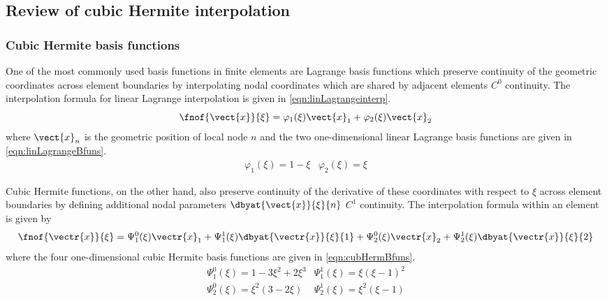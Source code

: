 \subsection{Review of cubic Hermite interpolation}

\subsubsection{Cubic Hermite basis functions}

One of the most commonly used basis functions in finite elements are Lagrange
basis functions which preserve continuity of the geometric coordinates across
element boundaries by interpolating nodal coordinates which are shared by
adjacent elements \ie  $C^{0}$ continuity.  The interpolation formula for
linear Lagrange interpolation is given in \eqref{eqn:linLagrangeinterp}.
\begin{equation}
  \fnof{\vect{x}}{\xi}=\varphi_{1}(\xi)\vect{x}_{1}+\varphi_{2}(\xi)\vect{x}_{2}
  \label{eqn:linLagrangeinterp}
\end{equation}
where $\vect{x}_{n}$ is the geometric position of local node $n$ and the two
one-dimensional linear Lagrange basis functions are given in
\eqref{eqn:linLagrangeBfuns}.
\begin{eqnarray}
  \varphi_{1}(\xi)=1-\xi & \varphi_{2}(\xi)=\xi
  \label{eqn:linLagrangeBfuns}
\end{eqnarray}

Cubic Hermite functions, on the other hand, also preserve continuity of the
derivative of these coordinates with respect to $\xi$ across element
boundaries by defining additional nodal parameters $\dbyat{\vect{x}}{\xi}{n}$
\ie $C^{1}$ continuity. The interpolation formula within an element is given
by
\begin{equation}
  \fnof{\vectr{x}}{\xi}=\Psi_{1}^{0}(\xi)\vectr{x}_{1}+\Psi_{1}^{1}(\xi)\dbyat{\vectr{x}}
  {\xi}{1}+\Psi_{2}^{0}(\xi)\vectr{x}_{2}+\Psi_{2}^{1}(\xi)\dbyat{\vectr{x}}{\xi}{2}
  \label{eqn:cubHermxiinterp}
\end{equation}
where the four one-dimensional cubic Hermite basis functions are given in 
\eqref{eqn:cubHermBfuns}.
\begin{eqnarray}
  \Psi_{1}^{0}(\xi)=1-3\xi^{2}+2\xi^{3} & \Psi_{1}^{1}(\xi)=\xi(\xi-1)^{2} 
  \nonumber \\
  \Psi_{2}^{0}(\xi)=\xi^{2}(3-2\xi) & \Psi_{2}^{1}(\xi)=\xi^{2}(\xi-1)
  \label{eqn:cubHermBfuns}
\end{eqnarray}

